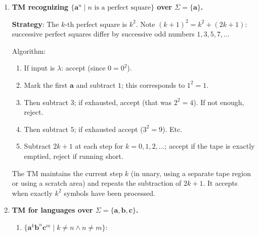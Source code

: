 \begin{enumerate}[{11.}1. ]
\begin{enumerate}
Transitions: $\delta(q_\text{start}, \pmb{a}) = (q_a, \overline{\pmb{a}}, R)$ [mark $\pmb{a}$, go right]; etc.

\item \textbf{Linear Bounded Automaton (LBA)}: Since the tape head never needs to go beyond the input boundaries (matching leftmost/rightmost within the input), the TM above is already an LBA. The computation uses only the $n$ tape cells containing the input.

\item \textbf{Nondeterminism/multiple tapes}: A two-tape TM copies the input to tape 2, reverses tape 2, and compares tape 1 with tape 2 symbol by symbol --- $O(n)$ time. A nondeterministic TM can guess the center and verify matching from both ends simultaneously.
\end{enumerate}

\item \textbf{TM recognizing $\{\pmb{a}^n \mid n \text{ is a perfect square}\}$ over $\Sigma=\{\pmb{a}\}$.}

\textbf{Strategy}: The $k$-th perfect square is $k^2$. Note $(k+1)^2 = k^2 + (2k+1)$: successive perfect squares differ by successive odd numbers $1, 3, 5, 7, \ldots$

Algorithm:
\begin{enumerate}[1.]
\item If input is $\lambda$: accept (since $0 = 0^2$).
\item Mark the first $\pmb{a}$ and subtract $1$; this corresponds to $1^2=1$.
\item Then subtract $3$; if exhausted, accept (that was $2^2=4$). If not enough, reject.
\item Then subtract $5$; if exhausted accept ($3^2=9$). Etc.
\item Subtract $2k+1$ at each step for $k=0,1,2,\ldots$; accept if the tape is exactly emptied, reject if running short.
\end{enumerate}

The TM maintains the current step $k$ (in unary, using a separate tape region or using a scratch area) and repeats the subtraction of $2k+1$. It accepts when exactly $k^2$ symbols have been processed.

\item \textbf{TM for languages over $\Sigma=\{\pmb{a},\pmb{b},\pmb{c}\}$.}

\begin{enumerate}
\item $\{\pmb{a}^k\pmb{b}^n\pmb{c}^m \mid k\neq n \wedge n\neq m\}$:


\end{enumerate}
\end{enumerate}
